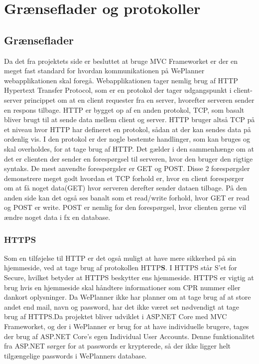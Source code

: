\chapter{Grænseflader og protokoller}

\section{Grænseflader}
Da det fra projektets side er besluttet at bruge MVC Frameworket er der en meget fast standard for hvordan kommunikationen på WePlanner webapplikationen skal foregå. Webapplikationen tager nemlig brug af HTTP Hypertext Transfer Protocol, som er en protokol der tager udgangspunkt i client-server princippet om at en client requester fra en server, hvorefter serveren sender en respons tilbage. HTTP er bygget op af en anden protokol, TCP, som basalt bliver brugt til at sende data mellem client og server. HTTP bruger altså TCP på et niveau hvor HTTP har defineret en protokol, sådan at der kan sendes data på ordenlig vis. I den protokol er der nogle bestemte handlinger, som kan bruges og skal overholdes, for at tage brug af HTTP. Det gælder i den sammenhænge om at det er clienten der sender en forespørgsel til serveren, hvor den bruger den rigtige syntaks. De mest anvendte forespørgsler er GET og POST\cite{httpWiki}. Disse 2 forespørgsler demonstrere meget godt hvordan et TCP forhold er, hvor en client forespørger om at få noget data(GET) hvor serveren derefter sender dataen tilbage. På den anden side kan det også ses banalt som et read/write forhold, hvor GET er read og POST er write. POST er nemlig for den forespørgsel, hvor clienten gerne vil ændre noget data i fx en database.

\subsection{HTTPS}

Som en tilføjelse til HTTP er det også muligt at have mere sikkerhed på sin hjemmeside, ved at tage brug af protokollen HTTP\textbf{S}. I HTTPS står S'et for Secure, hvilket betyder at HTTPS beskytter ens hjemmeside. HTTPS er vigtig at brug hvis en hjemmeside skal håndtere informationer som CPR nummer eller dankort oplysninger. Da WePlanner ikke har planner om at tage brug af at store andet end mail, navn og password, har det ikke været set nødvendigt at tage brug af HTTPS.\newline Da projektet bliver udviklet i ASP.NET Core med MVC Frameworket, og der i WePlanner er brug for at have individuelle brugere, tages der brug af ASP.NET Core's egen Individual User Accounts\cite{aspDotNetUserAccounts}. Denne funktionalitet fra ASP.NET sørger for at passwords er krypterede, så der ikke ligger helt tilgængelige passwords i WePlanners database.


